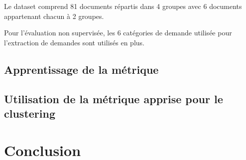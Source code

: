 Le dataset comprend 81 documents répartis dans 4 groupes avec 6 documents appartenant chacun à 2 groupes.

Pour l'évaluation non supervisée, les 6 catégories de demande utilisée pour l'extraction de demandes sont utilisés en plus.

\subsection{Apprentissage de la métrique}


\subsection{Utilisation de la métrique apprise pour le clustering}


\section{Conclusion}
\label{sec:similarite:conclusion}